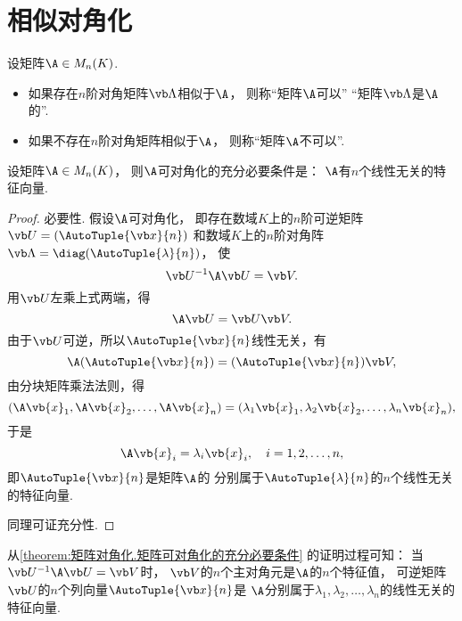 \section{相似对角化}
\begin{definition}
设矩阵\(\A \in M_n(K)\).
\begin{itemize}
	\item 如果存在\(n\)阶对角矩阵\(\vb\Lambda\)相似于\(\A\)，
	则称“矩阵\(\A\)可以”
	“矩阵\(\vb\Lambda\)是\(\A\)的”.
	\item 如果不存在\(n\)阶对角矩阵相似于\(\A\)，
	则称“矩阵\(\A\)不可以”.
\end{itemize}
\end{definition}

\begin{theorem}\label{theorem:矩阵对角化.矩阵可对角化的充分必要条件}
设矩阵\(\A \in M_n(K)\)，
则\(\A\)可对角化的充分必要条件是：
\(\A\)有\(n\)个线性无关的特征向量.
\begin{proof}
必要性.
假设\(\A\)可对角化，
即存在数域\(K\)上的\(n\)阶可逆矩阵\(\P=(\AutoTuple{\x}{n})\)
和数域\(K\)上的\(n\)阶对角阵\(\vb\Lambda=\diag(\AutoTuple{\lambda}{n})\)，
使\[
	\P^{-1}\A\P=\V.
\]
用\(\P\)左乘上式两端，得\[
	\A\P=\P\V.
\]
由于\(\P\)可逆，所以\(\AutoTuple{\x}{n}\)线性无关，有\[
	\A(\AutoTuple{\x}{n})
	=(\AutoTuple{\x}{n})\V,
\]
由分块矩阵乘法法则，得\[
	(\A\vb{x}_1,\A\vb{x}_2,\dotsc,\A\vb{x}_n)
	=(\lambda_1\vb{x}_1,\lambda_2\vb{x}_2,\dotsc,\lambda_n\vb{x}_n),
\]
于是\[
	\A\vb{x}_i=\lambda_i\vb{x}_i,
	\quad i=1,2,\dotsc,n,
\]
即\(\AutoTuple{\x}{n}\)是矩阵\(\A\)的
分别属于\(\AutoTuple{\lambda}{n}\)的\(n\)个线性无关的特征向量.

同理可证充分性.
\end{proof}
\end{theorem}
\begin{remark}
从\cref{theorem:矩阵对角化.矩阵可对角化的充分必要条件} 的证明过程可知：
{\color{red}当\(\P^{-1}\A\P=\V\)时，
\(\V\)的\(n\)个主对角元是\(\A\)的\(n\)个特征值，
可逆矩阵\(\P\)的\(n\)个列向量\(\AutoTuple{\x}{n}\)是
\(\A\)分别属于\(\lambda_1,\lambda_2,\dotsc,\lambda_n\)的线性无关的特征向量.}
\end{remark}

